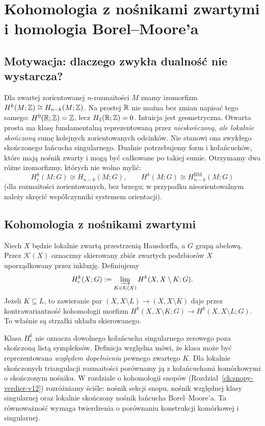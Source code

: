 \chapter{Kohomologia z nośnikami zwartymi i homologia Borel--Moore'a}
\label{ch:compact-bm-v11}

\section{Motywacja: dlaczego zwykła dualność nie wystarcza?}
Dla zwartej zorientowanej $n$-rozmaitości $M$ znamy izomorfizm
$H^k(M;\mathbb{Z})\cong H_{n-k}(M;\mathbb{Z})$. Na prostej $\mathbb{R}$ nie można
bez zmian napisać tego samego: $H^0(\mathbb{R};\mathbb{Z})=\mathbb{Z}$, lecz
$H_1(\mathbb{R};\mathbb{Z})=0$. Intuicja jest geometryczna.
Otwarta prosta ma klasę fundamentalną reprezentowaną przez
\emph{nieskończoną, ale lokalnie skończoną} sumę kolejnych
zorientowanych odcinków. Nie stanowi ona zwykłego skończonego
łańcucha singularnego. Dualnie potrzebujemy form i kołańcuchów,
które mają nośnik zwarty i mogą być całkowane po takiej sumie.
Otrzymamy dwa różne izomorfizmy, których nie wolno mylić:
\[
H_c^k(M;G)\cong H_{n-k}(M;G),\qquad
H^k(M;G)\cong H_{n-k}^{\mathrm{BM}}(M;G)
\]
(dla rozmaitości zorientowanych, bez brzegu; w przypadku
nieorientowalnym należy skręcić współczynniki systemem orientacji).

\section{Kohomologia z nośnikami zwartymi}
\begin{definicja}
\label{def:compact-support-cohom-v11}
Niech $X$ będzie lokalnie zwartą przestrzenią Hausdorffa,
a $G$ grupą abelową. Przez $\mathcal K(X)$ oznaczmy
skierowany zbiór zwartych podzbiorów $X$ uporządkowany
przez inkluzję. Definiujemy
\[
H_c^k(X;G):=\varinjlim_{K\in\mathcal K(X)}
H^k(X,X\setminus K;G).
\]
Jeżeli $K\subseteq L$, to zawieranie par
$(X,X\setminus L)\to(X,X\setminus K)$ daje przez
kontrawariantność kohomologii morfizm
$H^k(X,X\setminus K;G)\to H^k(X,X\setminus L;G)$.
To właśnie są strzałki układu skierowanego.
\end{definicja}

\begin{uwaga}
Klasa $H_c^k$ nie oznacza dowolnego kołańcucha singularnego
zerowego poza skończoną listą sympleksów. Definicja względna
mówi, że klasa może być reprezentowana \emph{względem dopełnienia}
pewnego zwartego $K$. Dla lokalnie skończonych triangulacji
rozmaitości porównamy ją z kołańcuchami komórkowymi o skończonym
nośniku. W rozdziale o kohomologii snopów (Rozdział~\ref{ch:snopy-verdier-v12}) rozróżniamy
ściśle: nośnik sekcji snopu, nośnik względnej klasy
singularnej oraz lokalnie skończony nośnik łańcucha Borel--Moore'a. Ta równoważność wymaga twierdzenia o porównaniu
konstrukcji komórkowej i singularnej.
\end{uwaga}


